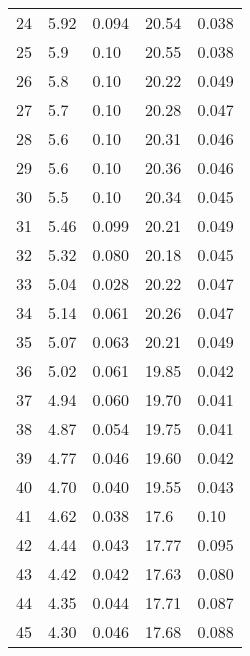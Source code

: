 \begin{table}
\begin{tabular}{c|ll|ll}
24 & 5.92 & 0.094 & 20.54 & 0.038 \\
25 & 5.9 & 0.10 & 20.55 & 0.038 \\
26 & 5.8 & 0.10 & 20.22 & 0.049 \\
27 & 5.7 & 0.10 & 20.28 & 0.047 \\
28 & 5.6 & 0.10 & 20.31 & 0.046 \\
29 & 5.6 & 0.10 & 20.36 & 0.046 \\
30 & 5.5 & 0.10 & 20.34 & 0.045 \\
31 & 5.46 & 0.099 & 20.21 & 0.049 \\
32 & 5.32 & 0.080 & 20.18 & 0.045 \\
33 & 5.04 & 0.028 & 20.22 & 0.047 \\
34 & 5.14 & 0.061 & 20.26 & 0.047 \\
35 & 5.07 & 0.063 & 20.21 & 0.049 \\
36 & 5.02 & 0.061 & 19.85 & 0.042 \\
37 & 4.94 & 0.060 & 19.70 & 0.041 \\
38 & 4.87 & 0.054 & 19.75 & 0.041 \\
39 & 4.77 & 0.046 & 19.60 & 0.042 \\
40 & 4.70 & 0.040 & 19.55 & 0.043 \\
41 & 4.62 & 0.038 & 17.6 & 0.10 \\
42 & 4.44 & 0.043 & 17.77 & 0.095 \\
43 & 4.42 & 0.042 & 17.63 & 0.080 \\
44 & 4.35 & 0.044 & 17.71 & 0.087 \\
45 & 4.30 & 0.046 & 17.68 & 0.088 \\
               \hline
        \end{tabular}
    \end{table}
    \clearpage

